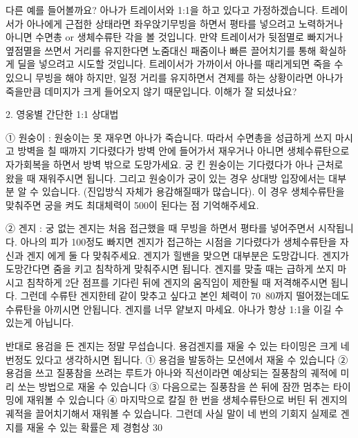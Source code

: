  

다른 예를 들어볼까요? 아나가 트레이서와 1:1을 하고 있다고 가정하겠습니다. 트레이서가 아나에게 근접한 상태라면 좌우앉기무빙을 하면서 평타를 넣으려고 노력하거나 아니면 수면총 or 생체수류탄 각을 볼 것입니다. 만약 트레이서가 뒷점멸로 빠지거나 옆점멸을 쓰면서 거리를 유지한다면 노줌대신 패줌이나 빠른 끌어치기를 통해 확실하게 딜을 넣으려고 시도할 것입니다. 트레이서가 가까이서 아나를 때리게되면 죽을 수 있으니 무빙을 해야 하지만, 일정 거리를 유지하면서 견제를 하는 상황이라면 아나가 죽을만큼 데미지가 크게 들어오지 않기 때문입니다. 이해가 잘 되셨나요?

 

2. 영웅별 간단한 1:1 상대법

 

① 원숭이 : 원숭이는 못 재우면 아나가 죽습니다. 따라서 수면총을 성급하게 쓰지 마시고 방벽을 칠 때까지 기다렸다가 방벽 안에 들어가서 재우거나 아니면 생체수류탄으로 자가회복을 하면서 방벽 밖으로 도망가세요. 궁 킨 원숭이는 기다렸다가 아나 근처로 왔을 때 재워주시면 됩니다. 그리고 원숭이가 궁이 있는 경우 상대방 입장에서는 대부분 알 수 있습니다. (진입방식 자체가 용감해질때가 많습니다). 이 경우 생체수류탄을 맞춰주면 궁을 켜도 최대체력이 500이 된다는 점 기억해주세요.

 

② 겐지 : 궁 없는 겐지는 처음 접근했을 때 무빙을 하면서 평타를 넣어주면서 시작됩니다. 아나의 피가 100정도 빠지면 겐지가 접근하는 시점을 기다렸다가 생체수류탄을 자신과 겐지 에게 둘 다 맞춰주세요. 겐지가 힐밴을 맞으면 대부분은 도망갑니다. 겐지가 도망간다면 줌을 키고 침착하게 맞춰주시면 됩니다. 겐지를 맞출 때는 급하게 쏘지 마시고 침착하게 2단 점프를 기다린 뒤에 겐지의 움직임이 제한될 때 저격해주시면 됩니다. 그런데 수류탄 겐지한테 같이 맞추고 싶다고 본인 체력이 70~80까지 떨어졌는데도 수류탄을 아끼시면 안됩니다. 겐지를 너무 얕보지 마세요. 아나가 항상 1:1을 이길 수 있는게 아닙니다.

 

반대로 용검을 든 겐지는 정말 무섭습니다. 용검겐지를 재울 수 있는 타이밍은 크게 네 번정도 있다고 생각하시면 됩니다. ① 용검을 발동하는 모션에서 재울 수 있습니다 ② 용검을 쓰고 질풍참을 쓰려는 루트가 아나와 직선이라면 예상되는 질풍참의 궤적에 미리 쏘는 방법으로 재울 수 있습니다 ③ 다음으로는 질풍참을 쓴 뒤에 잠깐 멈추는 타이밍에 재워볼 수 있습니다 ④ 마지막으로 칼질 한 번을 생체수류탄으로 버틴 뒤 겐지의 궤적을 끌어치기해서 재워볼 수 있습니다. 그런데 사실 말이 네 번의 기회지 실제로 겐지를 재울 수 있는 확률은 제 경험상 30%

